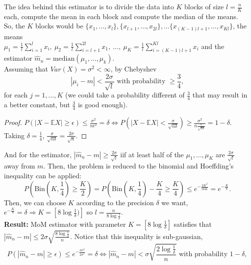 \documentclass[11pt, english]{article}
\begin{document}
The idea behind this estimator is to divide the data into $K$ blocks of size $l=\frac{n}{K}$ each, compute the mean in each block and compute the median of the means. \\

So, the $K$ blocks would be $\{x_1,\dots,x_l\},\{x_{l+1},\dots,x_{2l}\},\dots\{x_{(K-1)l+1},\dots,x_{Kl}\}$, the means\\ $\mu_1=\frac{1}{l}\sum\limits_{i=1}^l x_i,\ \mu_2=\frac{1}{l}\sum\limits_{i=l+1}^{2l}x_1,\ \dots,\ \mu_K=\frac{1}{l}\sum\limits_{i=(K-1)l+1}^{Kl}x_i$ and the estimator $\hat{m}_n=\text{median}(\mu_1,\dots,\mu_k)$.\\

Assuming that $Var(X)=\sigma^2<\infty$, by Chebyshev 
\begin{equation}
	|\mu_i-m|< \frac{2\sigma}{\sqrt{l}}\text{ with probability }\geq \frac{3}{4},
\end{equation}
for each $j=1,\dots,K$ (we could take a probability different of $\frac{3}{4}$ that may result in a better constant, but $\frac{3}{4}$ is good enough). 
\begin{proof}
	$P(|X-\mathbb{E}X|\geq\epsilon)\leq\frac{\sigma^2}{n\epsilon^2}=\delta\Leftrightarrow P(|X-\mathbb{E}X|<\frac{\sigma}{\sqrt{n\delta}}) \geq \frac{\sigma^2}{n\frac{\sigma}{\sqrt{n\delta}}} = 1-\delta$. Taking $\delta=\frac{1}{4}$, $\frac{\sigma}{\sqrt{n\delta}}=\frac{2\sigma}{\sqrt{n}}$.
\end{proof}
And for the estimator, $|\hat{m}_n-m|\geq \frac{2\sigma}{\sqrt{l}}$ iif at least half of the $\mu_1,\dots,\mu_K$ are $\frac{2\sigma}{\sqrt{l}}$ away from $m$. Then, the problem is reduced to the binomial and Hoeffding's inequality can be applied:
\begin{equation}
	P(\text{Bin}(K,\frac{1}{4})\geq \frac{K}{2})=P(\text{Bin}(K,\frac{1}{4})-\frac{K}{4}\geq \frac{K}{4})\leq e^{-\frac{2K^2}{16K}}=e^{-\frac{K}{8}}.
\end{equation} 
Then, we can choose $K$ according to the precision $\delta$ we want, $e^{-\frac{K}{8}}=\delta\Rightarrow K=[8\log\frac{1}{\delta})]$ so $l=\frac{n}{8\log\frac{1}{\delta}}$.\\

\textbf{Result:} MoM estimator with parameter $K=[8\log\frac{1}{\delta}]$ satisfies that $|\hat{m}_n-m|\leq 2\sigma\sqrt{\frac{8\log\frac{1}{\delta}}{n}}$. Notice that this inequality is sub-gaussian, 
\begin{equation}
	P(|\hat{m}_n-m|\geq\epsilon)\leq e^{-\frac{n\epsilon^2}{2\sigma^2}}=\delta\Leftrightarrow |\hat{m}_n-m|<\sigma\sqrt{\frac{2\log\frac{1}{\delta}}{n}}\text{ with probability }1-\delta,
\end{equation} 
\end{document}
